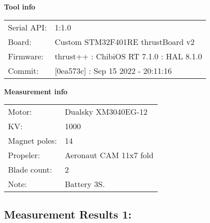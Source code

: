 \documentclass[10pt]{article}
\begin{document}
\noindent
{\large \bf Tool info}
\vspace{3mm}

\noindent
\begin{tabular}{ll}
Serial API:  & 1:1.0\\ 
Board:       & Custom STM32F401RE thrustBoard v2\\ 
Firmware:    & thrust++ : ChibiOS RT 7.1.0 : HAL 8.1.0\\ 
Commit:      & [0ea573c] : Sep 15 2022 - 20:11:16
\end{tabular}
\vspace{3mm}

\noindent
{\large \bf Measurement info}
\vspace{3mm}

\noindent
\begin{tabular}{ll}
Motor:        & Dualsky XM3040EG-12\\ 
KV:           & 1000\\ 
Magnet poles: & 14\\ 
Propeler:     & Aeronaut CAM 11x7 fold\\ 
Blade count:  & 2\\ 
Note:         & Battery 3S.
\end{tabular}

\vspace{3mm}


\subsection*{\large \bf Measurement Results 1:}
\end{document}
